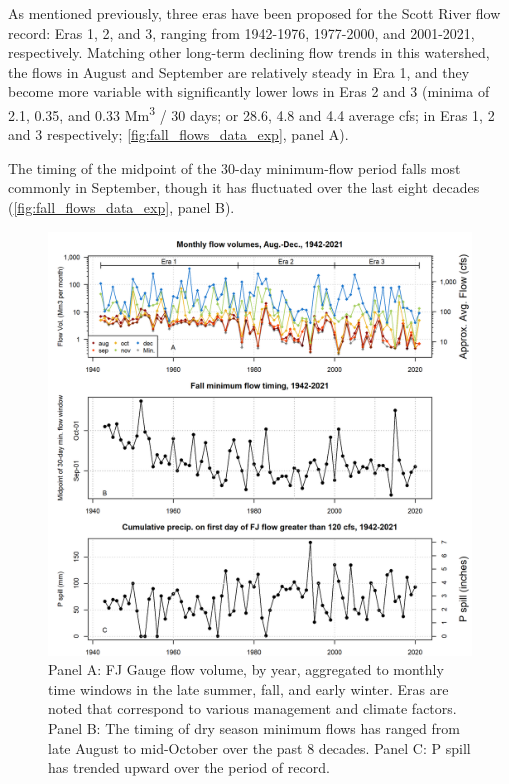 \documentclass[hess, manuscript]{copernicus}
\begin{document}
As mentioned previously, three eras have been proposed for the Scott
River flow record: Eras 1, 2, and 3, ranging from 1942-1976, 1977-2000,
and 2001-2021, respectively. Matching other long-term declining flow
trends in this watershed, the flows in August and September are
relatively steady in Era 1, and they become more variable with
significantly lower lows in Eras 2 and 3 (minima of 2.1, 0.35, and 0.33
Mm\textsuperscript{3} / 30 days; or 28.6, 4.8 and 4.4 average cfs; in
Eras 1, 2 and 3 respectively; \autoref{fig:fall_flows_data_exp}, panel
A).

The timing of the midpoint of the 30-day minimum-flow period falls most
commonly in September, though it has fluctuated over the last eight
decades (\autoref{fig:fall_flows_data_exp}, panel B).

\begin{figure}
\includegraphics[width=1\linewidth]{f06} \caption{\label{fig:fall_flows_data_exp} Panel A: FJ Gauge flow volume, by year, aggregated to monthly time windows in the late summer, fall, and early winter. Eras are noted that correspond to various management and climate factors. Panel B: The timing of dry season minimum flows has ranged from late August to mid-October over the past 8 decades. Panel C: P spill has trended upward over the period of record.}\label{fig:fall_flows_data_exp}
\end{figure}
\end{document}
